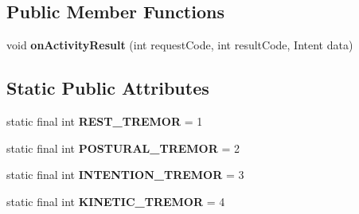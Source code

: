 \subsection*{Public Member Functions}
\begin{DoxyCompactItemize}
\item 
void {\bfseries on\+Activity\+Result} (int request\+Code, int result\+Code, Intent data)\hypertarget{classcom_1_1example_1_1android_1_1wearable_1_1wcldemo_1_1TremorActivity_af12872baff997c8c77b121a77f98faf6}{}\label{classcom_1_1example_1_1android_1_1wearable_1_1wcldemo_1_1TremorActivity_af12872baff997c8c77b121a77f98faf6}

\end{DoxyCompactItemize}
\subsection*{Static Public Attributes}
\begin{DoxyCompactItemize}
\item 
static final int {\bfseries R\+E\+S\+T\+\_\+\+T\+R\+E\+M\+OR} = 1\hypertarget{classcom_1_1example_1_1android_1_1wearable_1_1wcldemo_1_1TremorActivity_a8558419112c2c869e38186f832983102}{}\label{classcom_1_1example_1_1android_1_1wearable_1_1wcldemo_1_1TremorActivity_a8558419112c2c869e38186f832983102}

\item 
static final int {\bfseries P\+O\+S\+T\+U\+R\+A\+L\+\_\+\+T\+R\+E\+M\+OR} = 2\hypertarget{classcom_1_1example_1_1android_1_1wearable_1_1wcldemo_1_1TremorActivity_a17a1c9f697d8970aadc557acf71a47f9}{}\label{classcom_1_1example_1_1android_1_1wearable_1_1wcldemo_1_1TremorActivity_a17a1c9f697d8970aadc557acf71a47f9}

\item 
static final int {\bfseries I\+N\+T\+E\+N\+T\+I\+O\+N\+\_\+\+T\+R\+E\+M\+OR} = 3\hypertarget{classcom_1_1example_1_1android_1_1wearable_1_1wcldemo_1_1TremorActivity_a1aecb460178eaff54ef6c0b23b37973f}{}\label{classcom_1_1example_1_1android_1_1wearable_1_1wcldemo_1_1TremorActivity_a1aecb460178eaff54ef6c0b23b37973f}

\item 
static final int {\bfseries K\+I\+N\+E\+T\+I\+C\+\_\+\+T\+R\+E\+M\+OR} = 4\hypertarget{classcom_1_1example_1_1android_1_1wearable_1_1wcldemo_1_1TremorActivity_a8ade371a98ab67d46264ac8b80e6afd6}{}\label{classcom_1_1example_1_1android_1_1wearable_1_1wcldemo_1_1TremorActivity_a8ade371a98ab67d46264ac8b80e6afd6}

\end{DoxyCompactItemize}
